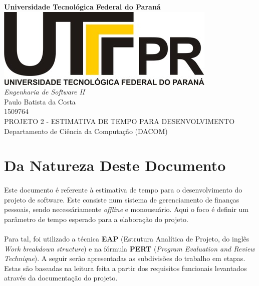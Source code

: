 \documentclass[12pt,a4paper]{article}
\author{Paulo Batista da Costa}
\title{}
\begin{document}
		
	        \begin{titlepage}
	        \LARGE
	        	\begin{center}
	        	\vspace{5cm} 
	        	\textbf{Universidade Tecnológica Federal do Paraná \\ \vspace{1.8cm}}
	        	\includegraphics[scale=0.35]{logoutfpr.jpg} \\ \vspace{1.8cm}
	        	\textit{Engenharia de Software II} \vspace{2cm} \\
	        	Paulo Batista da Costa \\ 1509764 \vspace{2cm} \\ 
	        	PROJETO 2 - ESTIMATIVA DE TEMPO PARA DESENVOLVIMENTO\vspace{2cm} \\
	        	Departamento de Ciência da Computação (DACOM) 
	        	
	        	\end{center}
	        \end{titlepage}	
		
			\tableofcontents
			\newpage
			\section{Da Natureza Deste Documento}
			\paragraph{} Este documento é referente à estimativa de tempo para o desenvolvimento do projeto de software. Este consiste num sistema de gerenciamento de finanças pessoais, sendo necessáriamente \textit{offline} e monousuário. Aqui o foco é definir um parâmetro de tempo esperado para a elaboração do projeto.
	
	\paragraph{} Para tal, foi utilizado a técnica \textbf{EAP} (Estrutura Analítica de Projeto, do inglês \textit{Work breakdown structure}) e na fórmula \textbf{PERT} (\textit{Program Evaluation and Review Technique}). A seguir serão apresentadas as subdivisões do trabalho em etapas. Estas são baseadas na leitura feita a partir dos requisitos funcionais levantados através da documentação do projeto. 
\end{document}

